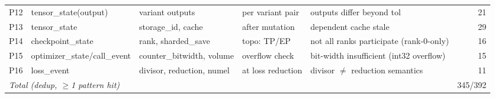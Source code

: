 \begin{table}[t]
\begin{tabular}{@{}cllll r@{}}
P12 & tensor\_state(output)     & variant outputs          & per variant pair        & outputs differ beyond tol                  & 21 \\
P13 & tensor\_state             & storage\_id, cache       & after mutation          & dependent cache stale                       & 29 \\
P14 & checkpoint\_state         & rank, sharded\_save      & topo: TP/EP             & not all ranks participate (rank-0-only)     & 16 \\
P15 & optimizer\_state/call\_event & counter\_bitwidth, volume & overflow check       & bit-width insufficient (int32 overflow)     & 15 \\
P16 & loss\_event               & divisor, reduction, numel & at loss reduction      & divisor $\neq$ reduction semantics          & 11 \\
\midrule
\multicolumn{5}{l}{\textit{Total (dedup, $\geq$1 pattern hit)}} & 345/392 \\
\bottomrule
\end{tabular}
\end{table}

